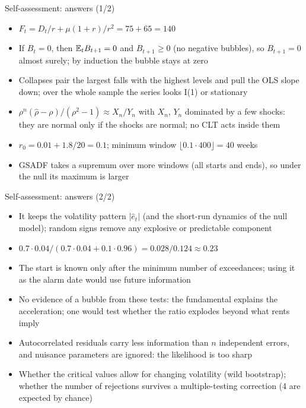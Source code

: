 \begin{frame}{Self-assessment: answers (1/2)}
\itemsize{\small}
\begin{itemize}
    \item $F_t = D_t/r + \mu(1 + r)/r^2 = 75 + 65 = 140$
    \item If $B_t = 0$, then $\mathbb{E}_t B_{t+1} = 0$ and $B_{t+1} \ge 0$ (no negative bubbles), so $B_{t+1} = 0$ almost surely; by induction the bubble stays at zero
    \item Collapses pair the largest falls with the highest levels and pull the OLS slope down; over the whole sample the series looks I(1) or stationary
    \item $\rho^n(\hat\rho - \rho)/(\rho^2 - 1) \approx X_n/Y_n$ with $X_n$, $Y_n$ dominated by a few shocks: they are normal only if the shocks are normal; no CLT acts inside them
    \item $r_0 = 0.01 + 1.8/20 = 0.1$; minimum window $\lfloor 0.1 \cdot 400\rfloor = 40$ weeks
    \item GSADF takes a supremum over more windows (all starts and ends), so under the null its maximum is larger
\end{itemize}
\end{frame}

\begin{frame}{Self-assessment: answers (2/2)}
\itemsize{\small}
\begin{itemize}
    \item It keeps the volatility pattern $|\hat e_t|$ (and the short-run dynamics of the null model); random signs remove any explosive or predictable component
    \item $0.7 \cdot 0.04/(0.7 \cdot 0.04 + 0.1 \cdot 0.96) = 0.028/0.124 \approx 0.23$
    \item The start is known only after the minimum number of exceedances; using it as the alarm date would use future information
    \item No evidence of a bubble from these tests: the fundamental explains the acceleration; one would test whether the ratio explodes beyond what rents imply
    \item Autocorrelated residuals carry less information than $n$ independent errors, and nuisance parameters are ignored: the likelihood is too sharp
    \item Whether the critical values allow for changing volatility (wild bootstrap); whether the number of rejections survives a multiple-testing correction (4 are expected by chance)
\end{itemize}
\end{frame}

